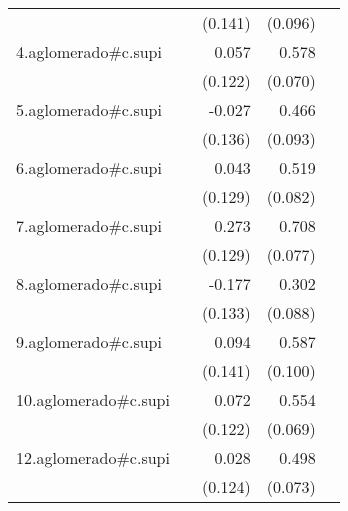 {\begin{longtable}{l*{4}{D{.}{.}{-1}}}
            &                     &     (0.141)         &     (0.096)         &                     \\
\addlinespace
4.aglomerado#c.supi&                     &       0.057         &       0.578\sym{***}&                     \\
            &                     &     (0.122)         &     (0.070)         &                     \\
\addlinespace
5.aglomerado#c.supi&                     &      -0.027         &       0.466\sym{***}&                     \\
            &                     &     (0.136)         &     (0.093)         &                     \\
\addlinespace
6.aglomerado#c.supi&                     &       0.043         &       0.519\sym{***}&                     \\
            &                     &     (0.129)         &     (0.082)         &                     \\
\addlinespace
7.aglomerado#c.supi&                     &       0.273\sym{*}  &       0.708\sym{***}&                     \\
            &                     &     (0.129)         &     (0.077)         &                     \\
\addlinespace
8.aglomerado#c.supi&                     &      -0.177         &       0.302\sym{***}&                     \\
            &                     &     (0.133)         &     (0.088)         &                     \\
\addlinespace
9.aglomerado#c.supi&                     &       0.094         &       0.587\sym{***}&                     \\
            &                     &     (0.141)         &     (0.100)         &                     \\
\addlinespace
10.aglomerado#c.supi&                     &       0.072         &       0.554\sym{***}&                     \\
            &                     &     (0.122)         &     (0.069)         &                     \\
\addlinespace
12.aglomerado#c.supi&                     &       0.028         &       0.498\sym{***}&                     \\
            &                     &     (0.124)         &     (0.073)         &                     \\

\end{longtable}}
